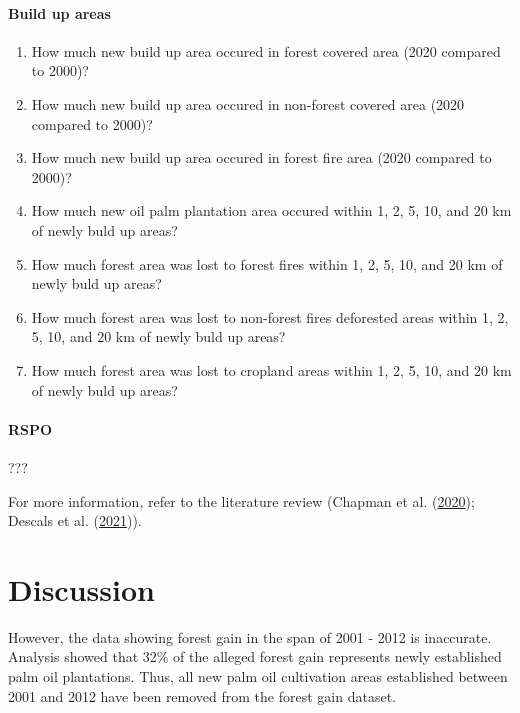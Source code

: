 \documentclass[
  letterpaper,
  DIV=11,
  numbers=noendperiod]{scrreprt}
\providecommand{\tightlist}{%
  \setlength{\itemsep}{0pt}\setlength{\parskip}{0pt}}\usepackage{longtable,booktabs,array}
\begin{document}
\hypertarget{build-up-areas}{%
\subsubsection{Build up areas}\label{build-up-areas}}

\begin{enumerate}
\def\labelenumi{\arabic{enumi}.}
\tightlist
\item
  How much new build up area occured in forest covered area (2020
  compared to 2000)?
\item
  How much new build up area occured in non-forest covered area (2020
  compared to 2000)?
\item
  How much new build up area occured in forest fire area (2020 compared
  to 2000)?
\item
  How much new oil palm plantation area occured within 1, 2, 5, 10, and
  20 km of newly buld up areas?
\item
  How much forest area was lost to forest fires within 1, 2, 5, 10, and
  20 km of newly buld up areas?
\item
  How much forest area was lost to non-forest fires deforested areas
  within 1, 2, 5, 10, and 20 km of newly buld up areas?
\item
  How much forest area was lost to cropland areas within 1, 2, 5, 10,
  and 20 km of newly buld up areas?
\end{enumerate}

\hypertarget{rspo}{%
\subsubsection{RSPO}\label{rspo}}

???

For more information, refer to the literature review (Chapman et al.
(\protect\hyperlink{ref-chapmanCompoundingImpactDeforestation2020}{2020});
Descals et al.
(\protect\hyperlink{ref-descalsHighresolutionGlobalMap2021}{2021})).


\hypertarget{discussion}{%
\chapter{Discussion}\label{discussion}}

However, the data showing forest gain in the span of 2001 - 2012 is
inaccurate. Analysis showed that 32\% of the alleged forest gain
represents newly established palm oil plantations. Thus, all new palm
oil cultivation areas established between 2001 and 2012 have been
removed from the forest gain dataset.
\end{document}
